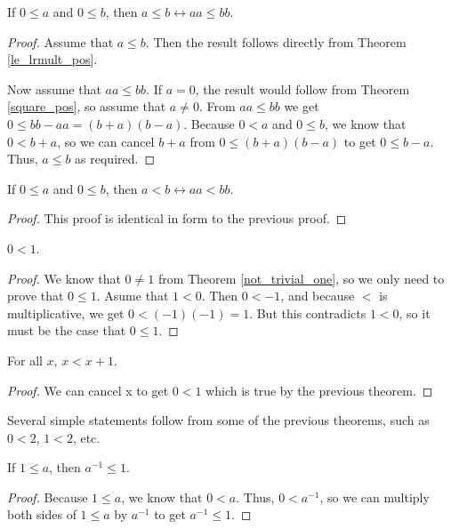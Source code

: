 \documentclass[../../math.tex]{subfiles}
\begin{document}
\begin{theorem}
    If $0 \leq a$ and $0 \leq b$, then $a \leq b \leftrightarrow aa \leq bb$.
\end{theorem}
\begin{proof}
    Assume that $a \leq b$.  Then the result follows directly from Theorem
    \ref{le_lrmult_pos}.

    Now assume that $aa \leq bb$.  If $a = 0$, the result would follow from
    Theorem \ref{square_pos}, so assume that $a \neq 0$.  From $aa \leq bb$ we
    get $0 \leq bb - aa = (b + a)(b - a)$.  Because $0 < a$ and $0 \leq b$, we
    know that $0 < b + a$, so we can cancel $b + a$ from $0 \leq (b + a)(b - a)$
    to get $0 \leq b - a$.  Thus, $a \leq b$ as required.
\end{proof}

\begin{theorem}
    If $0 \leq a$ and $0 \leq b$, then $a < b \leftrightarrow aa < bb$.
\end{theorem}
\begin{proof}
    This proof is identical in form to the previous proof.
\end{proof}

\begin{theorem} \label{one_pos}
    $0 < 1$.
\end{theorem}
\begin{proof}
    We know that $0 \neq 1$ from Theorem \ref{not_trivial_one}, so we only need
    to prove that $0 \leq 1$.  Asume that $1 < 0$.  Then $0 < -1$, and because
    $<$ is multiplicative, we get $0 < (-1)(-1) = 1$.  But this contradicts $1 <
    0$, so it must be the case that $0 \leq 1$.
\end{proof}

\begin{theorem}
    For all $x$, $x < x + 1$.
\end{theorem}
\begin{proof}
    We can cancel x to get $0 < 1$ which is true by the previous theorem.
\end{proof}

Several simple statements follow from some of the previous theorems, such as $0
< 2$, $1 < 2$, etc.

\begin{theorem} \label{inv_ge_one}
    If $1 \leq a$, then $a^{-1} \leq 1$.
\end{theorem}
\begin{proof}
    Because $1 \leq a$, we know that $0 < a$.  Thus, $0 < a^{-1}$, so we can
    multiply both sides of $1 \leq a$ by $a^{-1}$ to get $a^{-1} \leq 1$.
\end{proof}
\end{document}

